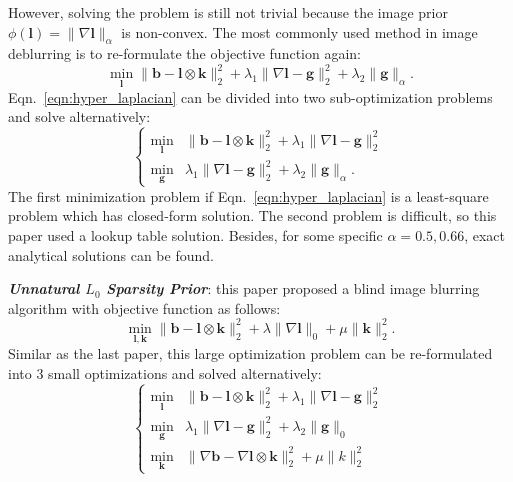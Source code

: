 \documentclass[journal, onecolumn, 10pt]{IEEEtran}
\begin{document}
However, solving the problem is still not trivial because the image prior $\phi(\mathbf{l}) = \|\nabla \mathbf{l}\|_{\alpha}$ is non-convex. The most commonly used method in image deblurring is to re-formulate the objective function again:
\begin{equation}
\min_{\mathbf{l}} \| \mathbf{b} - \mathbf{l} \otimes \mathbf{k} \|_2^2 + \lambda_1 \|\nabla \mathbf{l} - \mathbf{g}\|_2^2 + \lambda_2\|\mathbf{g}\|_{\alpha}.
\label{eqn:hyper_laplacian}
\end{equation}
Eqn.~\ref{eqn:hyper_laplacian} can be divided into two sub-optimization problems and solve alternatively:
\begin{equation}
\begin{cases}
\min_{\mathbf{l}} &\| \mathbf{b} - \mathbf{l} \otimes \mathbf{k} \|_2^2 + \lambda_1 \|\nabla \mathbf{l} - \mathbf{g}\|_2^2 \\
\min_{\mathbf{g}} &\lambda_1\|\nabla \mathbf{l} - \mathbf{g}\|_2^2 + \lambda_2\|\mathbf{g}\|_{\alpha}.
\end{cases}
\label{eqn:hyper_laplacian}
\end{equation}
The first minimization problem if Eqn.~\ref{eqn:hyper_laplacian} is a least-square problem which has closed-form solution. The second problem is difficult, so this paper used a lookup table solution. Besides, for some specific $\alpha = 0.5, 0.66$, exact analytical solutions can be found.

\textbf{\emph{Unnatural $L_0$ Sparsity Prior}}\cite{xu2013unnatural}: this paper proposed a blind image blurring algorithm with objective function as follows:
\begin{equation}
\min_{\mathbf{l}, \mathbf{k}} \| \mathbf{b} - \mathbf{l} \otimes \mathbf{k} \|_2^2 + \lambda \|\nabla \mathbf{l} \|_0 + \mu \| \mathbf{k} \|_2^2.
\label{eqn:l0_sparse}
\end{equation}
Similar as the last paper, this large optimization problem can be re-formulated into 3 small optimizations and solved alternatively:
\begin{equation}
\begin{cases}
\min_{\mathbf{l}} &\| \mathbf{b} - \mathbf{l} \otimes \mathbf{k} \|_2^2 + \lambda_1 \|\nabla \mathbf{l} - \mathbf{g}\|_2^2 \\
\min_{\mathbf{g}} &\lambda_1\|\nabla \mathbf{l} - \mathbf{g}\|_2^2 + \lambda_2\|\mathbf{g}\|_{0} \\
\min_{\mathbf{k}} &\| \nabla\mathbf{b} - \nabla\mathbf{l} \otimes \mathbf{k} \|_2^2 + \mu \|k\|_2^2
\end{cases}
\label{eqn:l0_sparse_alter}
\end{equation}
\end{document}
